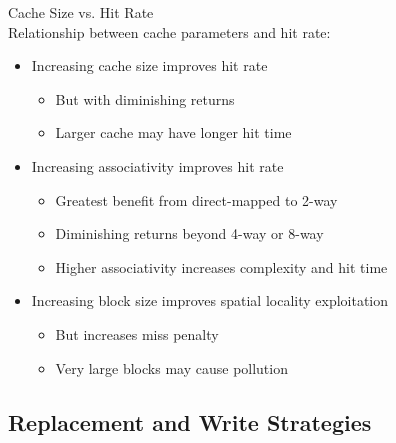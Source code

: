 \begin{concept}{Cache Size vs. Hit Rate}\\
Relationship between cache parameters and hit rate:
\begin{itemize}
    \item Increasing cache size improves hit rate
    \begin{itemize}
        \item But with diminishing returns
        \item Larger cache may have longer hit time
    \end{itemize}
    \item Increasing associativity improves hit rate
    \begin{itemize}
        \item Greatest benefit from direct-mapped to 2-way
        \item Diminishing returns beyond 4-way or 8-way
        \item Higher associativity increases complexity and hit time
    \end{itemize}
    \item Increasing block size improves spatial locality exploitation
    \begin{itemize}
        \item But increases miss penalty
        \item Very large blocks may cause pollution
    \end{itemize}
\end{itemize}
\end{concept}

\subsection{Replacement and Write Strategies}

